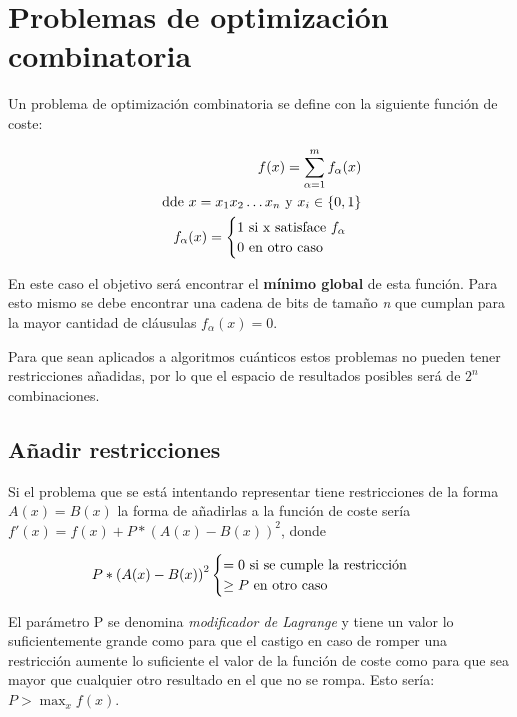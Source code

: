 \section{Problemas de optimización combinatoria\label{sec:3-problemas de optimizacion combinatoria}}

Un problema de optimización combinatoria se define con la siguiente función de coste:

\begin{align*}
  f(x) = \sum_{\alpha = 1}^{m} f_\alpha(x) \\
  \textnormal{ dde } x = x_1x_2 \ldots x_n \textnormal{ y } x_i\in{\{0, 1\}} \\
   f_{\alpha}(x) = \begin{cases}
     1 \textnormal{ si x satisface } f_\alpha \\
     0 \textnormal{ en otro caso}
   \end{cases}
\end{align*}

En este caso el objetivo será encontrar el \textbf{mínimo global} de esta función. Para esto mismo se debe encontrar una cadena de bits de tamaño \textit{n} que cumplan para la mayor cantidad de cláusulas $f_\alpha(x) = 0$.

Para que sean aplicados a algoritmos cuánticos estos problemas no pueden tener restricciones añadidas, por lo que el espacio de resultados posibles será de $2^n$ combinaciones.

\subsection{Añadir restricciones}

Si el problema que se está intentando representar tiene restricciones de la forma $A(x) = B(x)$ la forma de añadirlas a la función de coste sería $f'(x) = f(x) + P*{(A(x)-B(x))}^2$, donde

\begin{align*}
  P*{(A(x) - B(x))}^2 \begin{cases}
    = 0 \textnormal{ si se cumple la restricción } \\
    \ge P \textnormal{ en otro caso }
  \end{cases}
\end{align*}

El parámetro P se denomina \textit{modificador de Lagrange} y tiene un valor lo suficientemente grande como para que el castigo en caso de romper una restricción aumente lo suficiente el valor de la función de coste como para que sea mayor que cualquier otro resultado en el que no se rompa. Esto sería: $P > \max_x{f(x)}$.

